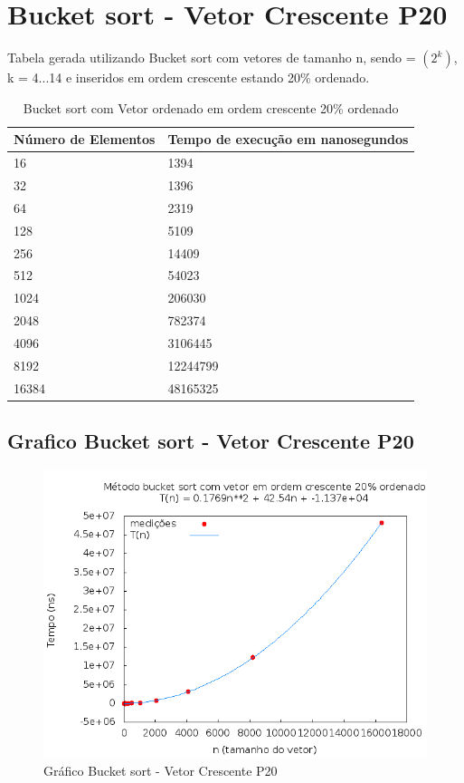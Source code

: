 \documentclass[12pt,a4paper,twoside]{report}
\begin{document}
\section{Bucket sort - Vetor Crescente P20}
Tabela gerada utilizando Bucket sort com vetores de tamanho n, sendo = $(2^k)$, k = 4...14 e inseridos em ordem crescente estando 20\% ordenado.

\begin{table}[H]
\centering
\caption{Bucket sort com Vetor ordenado em ordem crescente 20\% ordenado}
\label{my-label}
\begin{tabular}{|l|l|}
\hline
\multicolumn{1}{|c|}{\textbf{Número de Elementos}} & \multicolumn{1}{c|}{\textbf{Tempo de execução em nanosegundos}} \\ \hline
16 & 1394 \\ \hline
32 & 1396 \\ \hline
64 & 2319 \\ \hline
128 & 5109 \\ \hline
256 & 14409 \\ \hline
512 & 54023 \\ \hline
1024 & 206030 \\ \hline
2048 & 782374 \\ \hline
4096 & 3106445 \\ \hline
8192 & 12244799 \\ \hline
16384 & 48165325 \\ \hline
\end{tabular}
\end{table}

\subsection{Grafico Bucket sort - Vetor Crescente P20}
\begin{figure}[H]
    \centering
    \includegraphics[width=0.7\linewidth]{graficos/Bucket/vIntCrescenteP20/vIntCrescenteP20.png}
  \caption{Gráfico Bucket sort - Vetor Crescente P20}
\end{figure}
\end{document}
